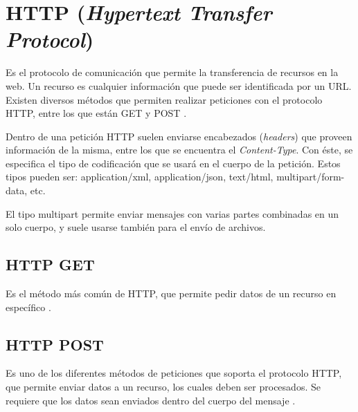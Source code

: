 \section{HTTP (\textit{Hypertext Transfer Protocol})}\label{HTTP}

Es el protocolo de comunicación que permite la transferencia de recursos en la web. Un recurso es cualquier información que puede ser identificada por un URL. Existen diversos métodos que permiten realizar peticiones con el protocolo HTTP, entre los que están GET y POST \cite{HTTP2}. 

Dentro de una petición HTTP suelen enviarse encabezados (\textit{headers}) que proveen información de la misma, entre los que se encuentra el \textit{Content-Type}. Con éste, se especifica el tipo de codificación que se usará en el cuerpo de la petición. Estos tipos pueden ser: application/xml, application/json, text/html, multipart/form-data, etc. 

El tipo multipart permite enviar mensajes con varias partes combinadas en un solo cuerpo, y suele usarse también para el envío de archivos. \cite{HTTP1}


\subsection{HTTP GET}

Es el método más común de HTTP, que permite pedir datos de un recurso en específico \cite{HTTP3}. 

\subsection{HTTP POST}

Es uno de los diferentes métodos de peticiones que soporta el protocolo HTTP, que permite enviar datos a un recurso, los cuales deben ser procesados. Se requiere que los datos sean enviados dentro del cuerpo del mensaje \cite{HTTP3}.

